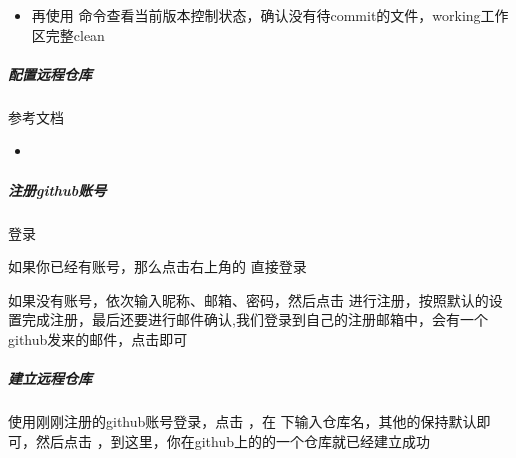 \documentclass[a4paper,10pt,english]{sphinxmanual}
\begin{document}
\begin{figure}[htbp]
\centering

\noindent{}
\end{figure}
\begin{itemize}
\item {} 
再使用  命令查看当前版本控制状态，确认没有待commit的文件，working工作区完整clean

\end{itemize}

\begin{figure}[htbp]
\centering

\noindent{}
\end{figure}


\subparagraph{配置远程仓库}
\label{\detokenize{sphinx/2-collocation/1-github/2-ConfigRemote::doc}}\label{\detokenize{sphinx/2-collocation/1-github/2-ConfigRemote:id1}}
参考文档
\begin{itemize}
\item {} 

\end{itemize}


\subparagraph{注册github账号}
\label{\detokenize{sphinx/2-collocation/1-github/2-ConfigRemote:github}}
登录 

如果你已经有账号，那么点击右上角的  直接登录

如果没有账号，依次输入昵称、邮箱、密码，然后点击  进行注册，按照默认的设置完成注册，最后还要进行邮件确认,我们登录到自己的注册邮箱中，会有一个github发来的邮件，点击即可

\begin{figure}[htbp]
\centering

\noindent{}
\end{figure}


\subparagraph{建立远程仓库}
\label{\detokenize{sphinx/2-collocation/1-github/2-ConfigRemote:id3}}
使用刚刚注册的github账号登录，点击  ，在  下输入仓库名，其他的保持默认即可，然后点击  ，到这里，你在github上的的一个仓库就已经建立成功

\begin{figure}[htbp]
\centering

\noindent{}
\end{figure}
\end{document}
